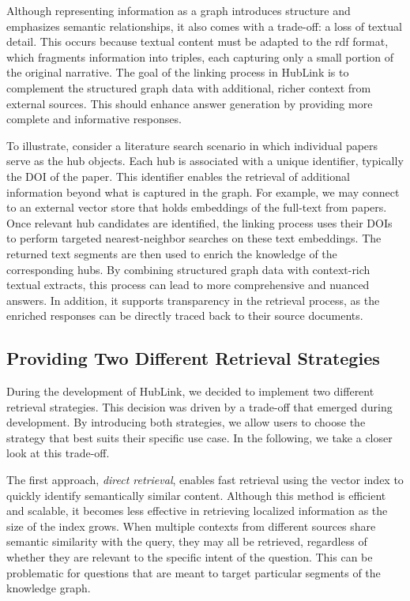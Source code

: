 Although representing information as a graph introduces structure and emphasizes semantic relationships, it also comes with a trade-off: a loss of textual detail. This occurs because textual content must be adapted to the \gls{rdf} format, which fragments information into triples, each capturing only a small portion of the original narrative. The goal of the linking process in HubLink is to complement the structured graph data with additional, richer context from external sources. This should enhance answer generation by providing more complete and informative responses.


To illustrate, consider a literature search scenario in which individual papers serve as the hub objects. Each hub is associated with a unique identifier, typically the DOI of the paper. This identifier enables the retrieval of additional information beyond what is captured in the graph. For example, we may connect to an external vector store that holds embeddings of the full-text from papers. Once relevant hub candidates are identified, the linking process uses their DOIs to perform targeted nearest-neighbor searches on these text embeddings. The returned text segments are then used to enrich the knowledge of the corresponding hubs. By combining structured graph data with context-rich textual extracts, this process can lead to more comprehensive and nuanced answers. In addition, it supports transparency in the retrieval process, as the enriched responses can be directly traced back to their source documents.



\subsection{Providing Two Different Retrieval Strategies} 

During the development of HubLink, we decided to implement two different retrieval strategies. This decision was driven by a trade-off that emerged during development. By introducing both strategies, we allow users to choose the strategy that best suits their specific use case. In the following, we take a closer look at this trade-off.

The first approach, \emph{direct retrieval}, enables fast retrieval using the vector index to quickly identify semantically similar content. Although this method is efficient and scalable, it becomes less effective in retrieving localized information as the size of the index grows. When multiple contexts from different sources share semantic similarity with the query, they may all be retrieved, regardless of whether they are relevant to the specific intent of the question. This can be problematic for questions that are meant to target particular segments of the knowledge graph.

